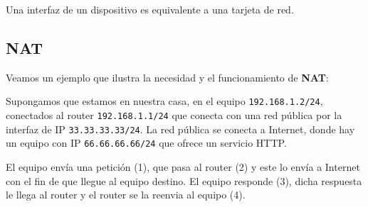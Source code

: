 \begin{observacion}
    Una interfaz de un dispositivo es equivalente a una tarjeta de red.
\end{observacion}



\subsection{\acrfull{NAT}}

Veamos un ejemplo que ilustra la necesidad y el funcionamiento de \textbf{\acrshort{NAT}}:

\begin{ejemplo}
    Supongamos que estamos en nuestra casa, en el equipo \verb|192.168.1.2/24|, conectados al router \verb|192.168.1.1/24| que conecta con una red pública por la interfaz de IP \verb|33.33.33.33/24|. La red pública se conecta a Internet, donde hay un equipo con IP \verb|66.66.66.66/24| que ofrece un servicio \acrshort{HTTP}.

    El equipo envía una petición (1), que pasa al router (2) y este lo envía a Internet con el fin de que llegue al equipo destino. El equipo responde (3), dicha respuesta le llega al router y el router se la reenvia al equipo  (4).
\end{ejemplo}

